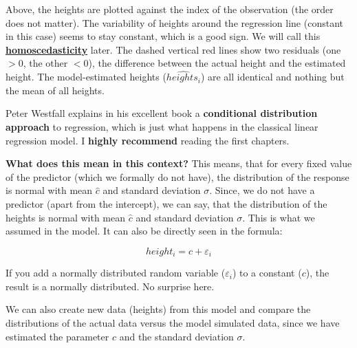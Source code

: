 \documentclass[
]{book}
\begin{document}
Above, the heights are plotted against the index of the observation (the order does not matter).
The variability of heights around the regression line (constant in this case) seems to
stay constant, which is a good sign. We will call this
\href{https://en.wikipedia.org/wiki/Homoscedasticity_and_heteroscedasticity}{\textbf{homoscedasticity}} later.
The dashed vertical red lines show two residuals (one \(>0\), the other \(<0\)), the difference between the actual height
and the estimated height. The model-estimated heights (\(\widehat{heights_i}\))
are all identical and nothing but the mean of all heights.

Peter Westfall explains in his excellent book a \textbf{conditional distribution
approach} to regression, which is just what happens in the classical linear regression model.
I \textbf{highly recommend} reading the first chapters.

\textbf{What does this mean in this context?}
This means, that for every fixed value of the predictor (which we formally do not have),
the distribution of the response is normal with mean \(\hat{c}\) and standard deviation \(\sigma\).
Since, we do not have a predictor (apart from the intercept), we can say, that the distribution of the heights is normal with mean \(\hat{c}\)
and standard deviation \(\sigma\). This is what we assumed in the model. It can also be directly seen
in the formula:

\[ height_i = c + \varepsilon_i \]

If you add a normally distributed random variable (\(\varepsilon_i\)) to a constant (\(c\)),
the result is a normally distributed. No surprise here.

We can also create new data (heights) from this model and compare the distributions
of the actual data versus the model simulated data, since we have estimated the
parameter \(c\) and the standard deviation \(\sigma\).
\end{document}

